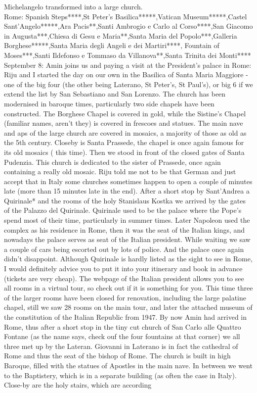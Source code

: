 Michelangelo transformed into a large church.\\

Rome: Spanish Steps****,St Peter's Basilica*****,Vatican Museum*****,Castel Sant'Angelo*****,Ara Pacis**,Santi Ambrogio e Carlo al Corso****,San Giacomo in Augusta***,Chiesa di Gesu e Maria**,Santa Maria del Popolo***,Galleria Borghese*****,Santa Maria degli Angeli e dei Martiri****, Fountain of Moses***,Santi Ildefonso e Tommaso da Villanova**,Santa Trinita dei Monti****\\

September 8: Amin joins us and paying a visit at the President's palace in Rome:\\
Riju and I started the day on our own in the Basilica of Santa Maria Maggiore - one of the big four (the other being Laterano, St Peter's, St Paul's), or big 6 if we extend the list by San Sebastiano and San Lorenzo. The church has been modernised in baroque times, particularly two side chapels have been constructed. The Borghese Chapel is covered in gold, while the Sistine's Chapel (familiar names, aren't they) is covered in frescoes and statues. The main nave and aps of the large church are covered in mosaics, a majority of those as old as the 5th century. Closeby is Santa Prassede, the chapel is once again famous for its old mosaics ( this time). Then we stood in front of the closed gates of Santa Pudenzia. This church is dedicated to the sister of Prassede, once again containing a really old mosaic. Riju told me not to be that German and just accept that in Italy some churches sometimes happen to open a couple of minutes late (more than 15 minutes late in the end). After a short stop by Sant'Andrea a Quirinale* and the rooms of the holy Stanislaus Kostka we arrived by the gates of the Palazzo del Quirinale. Quirinale used to be the palace where the Pope's spend most of their time, particularly in summer times. Later Napoleon used the complex as his residence in Rome, then it was the seat of the Italian kings, and nowadays the palace serves as seat of the Italian president. While waiting we saw a couple of cars being escorted out by lots of police. And the palace once again didn't disappoint. Although Quirinale is hardly listed as the sight to see in Rome, I would definitely advice you to put it into your itinerary and book in advance (tickets are very cheap). The webpage of the Italian president allows you to see all rooms in a virtual tour, so check out if it is something for you. This time three of the larger rooms have been closed for renovation, including the large palatine chapel, still we saw 28 rooms on the main tour, and later the attached museum of the constitution of the Italian Republic from 1947. By now Amin had arrived in Rome, thus after a short stop in the tiny cut church of San Carlo alle Quattro Fontane (as the name says, check ouf the four fountains at that corner) we all three met up by the Lateran. Giovanni in Laterano is in fact the cathedral of Rome and thus the seat of the bishop of Rome. The church is built in high Baroque, filled with the statues of Apostles in the main nave. In between we went to the Baptistery, which is in a separate building (as often the case in Italy). Close-by are the holy stairs, which are according 